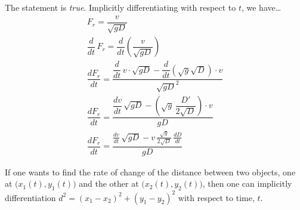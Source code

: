 \documentclass[11pt,letterpaper]{article}
\begin{document}
\sol The statement is \textit{true}. Implicitly differentiating with respect to $t$, we have\dots
	\[
	\begin{gathered}
	F_r= \dfrac{v}{\sqrt{gD}} \\
	\dfrac{d}{dt} \,F_r= \dfrac{d}{dt} \left( \dfrac{v}{\sqrt{gD}} \right) \\
	\dfrac{dF_r}{dt}= \dfrac{\dfrac{d}{dt}\, v \cdot \sqrt{gD} - \dfrac{d}{dt} ( \sqrt{g} \sqrt{D}) \cdot v}{\sqrt{gD}^2} \\
	\dfrac{dF_r}{dt}= \dfrac{\dfrac{dv}{dt}\, \sqrt{gD} - \left( \sqrt{g}\, \dfrac{D'}{2\sqrt{D}} \right) \cdot v}{gD} \\
	\dfrac{dF_r}{dt}= \dfrac{\frac{dv}{dt}\, \sqrt{gD} - v \, \frac{\sqrt{g}}{2 \sqrt{D}}\, \frac{dD}{dt}}{gD}
	\end{gathered}
	\]



\newpage



 If one wants to find the rate of change of the distance between two objects, one at $\big(x_1(t), y_1(t) \big)$ and the other at $\big(x_2(t), y_2(t) \big)$, then one can implicitly differentiation $d^2= (x_1 - x_2)^2 + (y_1 - y_2)^2$ with respect to time, $t$. \pspace
\end{document}
